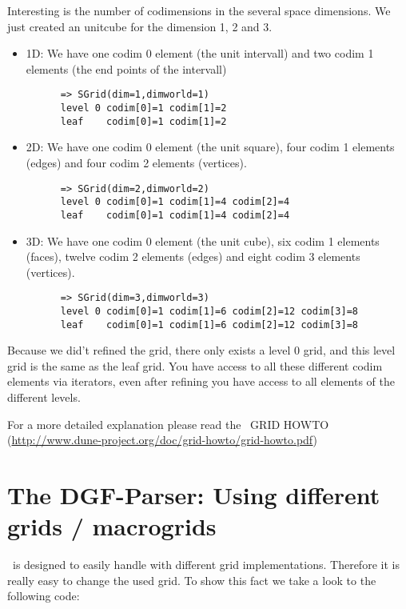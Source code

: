 Interesting is the number of codimensions in the several space dimensions. We just created an unitcube for the 
dimension 1, 2 and 3. 
\begin{itemize}
 \item 1D: We have one codim 0 element (the unit intervall) and two codim 1 elements (the end points of the intervall)
    \begin{lstlisting}
      => SGrid(dim=1,dimworld=1)
      level 0 codim[0]=1 codim[1]=2
      leaf    codim[0]=1 codim[1]=2
    \end{lstlisting}
 \item 2D: We have one codim 0 element (the unit square), four codim 1 elements (edges) and four codim 2 elements (vertices).
    \begin{lstlisting}
      => SGrid(dim=2,dimworld=2)
      level 0 codim[0]=1 codim[1]=4 codim[2]=4
      leaf    codim[0]=1 codim[1]=4 codim[2]=4
    \end{lstlisting}
 \item 3D: We have one codim 0 element (the unit cube), six codim 1 elements (faces), twelve codim 2 elements (edges) 
           and eight codim 3 elements (vertices).
    \begin{lstlisting}
      => SGrid(dim=3,dimworld=3)
      level 0 codim[0]=1 codim[1]=6 codim[2]=12 codim[3]=8
      leaf    codim[0]=1 codim[1]=6 codim[2]=12 codim[3]=8
    \end{lstlisting}
\end{itemize}
Because we did't refined the grid, there only exists a level 0 grid, and this level grid is the same as the leaf grid.
You have access to all these different codim elements via iterators, even after refining you have access to all elements of the different levels.

For a more detailed explanation please read the \Dune\ GRID HOWTO 
(\url{http://www.dune-project.org/doc/grid-howto/grid-howto.pdf}) 



\section{The DGF-Parser: Using different grids / macrogrids}
\Dune\ is designed to easily handle with different grid implementations. Therefore it is really easy to change the used grid.
To show this fact we take a look to the following code:

  \begin{lst} \mbox{}
    
  \end{lst}

